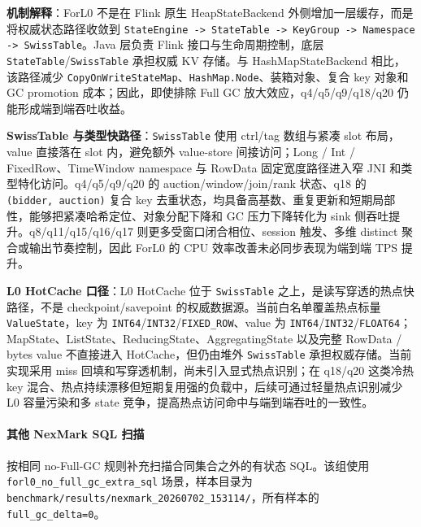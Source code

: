 \documentclass[a4paper,11pt]{article}
\begin{document}
\textbf{机制解释}：ForL0 不是在 Flink 原生 HeapStateBackend 外侧增加一层缓存，而是将权威状态路径收敛到 \texttt{StateEngine -> StateTable -> KeyGroup -> Namespace -> SwissTable}。Java 层负责 Flink 接口与生命周期控制，底层 \texttt{StateTable}/\texttt{SwissTable} 承担权威 KV 存储。与 HashMapStateBackend 相比，该路径减少 \texttt{CopyOnWriteStateMap}、\texttt{HashMap.Node}、装箱对象、复合 key 对象和 GC promotion 成本；因此，即使排除 Full GC 放大效应，q4/q5/q9/q18/q20 仍能形成端到端吞吐收益。

\textbf{SwissTable 与类型快路径}：\texttt{SwissTable} 使用 ctrl/tag 数组与紧凑 slot 布局，value 直接落在 slot 内，避免额外 value-store 间接访问；Long / Int / FixedRow、TimeWindow namespace 与 RowData 固定宽度路径进入窄 JNI 和类型特化访问。q4/q5/q9/q20 的 auction/window/join/rank 状态、q18 的 \texttt{(bidder, auction)} 复合 key 去重状态，均具备高基数、重复更新和短期局部性，能够把紧凑哈希定位、对象分配下降和 GC 压力下降转化为 sink 侧吞吐提升。q8/q11/q15/q16/q17 则更多受窗口闭合相位、session 触发、多维 distinct 聚合或输出节奏控制，因此 ForL0 的 CPU 效率改善未必同步表现为端到端 TPS 提升。

\textbf{L0 HotCache 口径}：L0 HotCache 位于 \texttt{SwissTable} 之上，是读写穿透的热点快路径，不是 checkpoint/savepoint 的权威数据源。当前白名单覆盖热点标量 \texttt{ValueState}，key 为 \texttt{INT64}/\texttt{INT32}/\texttt{FIXED\_ROW}、value 为 \texttt{INT64}/\texttt{INT32}/\texttt{FLOAT64}；MapState、ListState、ReducingState、AggregatingState 以及完整 RowData / bytes value 不直接进入 HotCache，但仍由堆外 \texttt{SwissTable} 承担权威存储。当前实现采用 miss 回填和写穿透机制，尚未引入显式热点识别；在 q18/q20 这类冷热 key 混合、热点持续漂移但短期复用强的负载中，后续可通过轻量热点识别减少 L0 容量污染和多 state 竞争，提高热点访问命中与端到端吞吐的一致性。

\paragraph{其他 NexMark SQL 扫描}
按相同 no-Full-GC 规则补充扫描合同集合之外的有状态 SQL。该组使用 \texttt{forl0\_no\_full\_gc\_extra\_sql} 场景，样本目录为 \texttt{benchmark/results/nexmark\_20260702\_153114/}，所有样本的 \texttt{full\_gc\_delta=0}。
\end{document}
